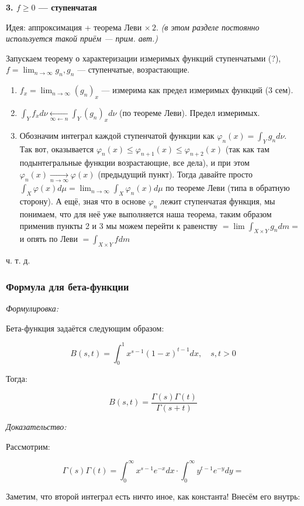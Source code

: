 \documentclass{article}
\def\goesto#1{\underset{#1}{\longrightarrow}}
\def\toinf#1{\goesto{#1 \rightarrow \infty}}
\def\ntoinf{\toinf{n}}
\begin{document}
\textbf{3. $f \ge 0$ --- ступенчатая}

Идея: аппроксимация + теорема Леви $\times \, 2$. \textit{(в этом разделе постоянно используется такой приём --- прим. авт.)}

Запускаем теорему о характеризации измеримых функций ступенчатыми (?), $f = \lim_{n \rightarrow \infty} g_n, g_n$ --- ступенчатые, возрастающие.

\begin{enumerate}
    \item $f_x = \lim_{n \rightarrow \infty} (g_n)_x$ --- измерима как предел измеримых функций (3 сем).
    \item $\int_{Y} f_x d\nu \underset{\infty \leftarrow n}{\longleftarrow} \int_{Y} (g_n)_x d\nu$ (по теореме Леви). Предел измеримых.
    \item Обозначим интеграл каждой ступенчатой функции как $\varphi_n(x) = \int_{Y} g_n d\nu$. Так вот, оказывается $\varphi_n(x) \le \varphi_{n + 1}(x) \le \varphi_{n + 2}(x)$ (так как там подынтегральные функции возрастающие, все дела), и при этом $\varphi_n(x) \ntoinf \varphi(x)$ (предыдущий пункт). Тогда давайте просто $\int_{X} \varphi(x) d\mu = \lim_{n \rightarrow \infty} \int_{X} \varphi_n(x) d\mu$ по теореме Леви (типа в обратную сторону). А ещё, зная что в основе $\varphi_n$ лежит ступенчатая функция, мы понимаем, что для неё уже выполняется наша теорема, таким образом применив пункты 2 и 3 мы можем перейти к равенству $= \lim \int_{X \times Y} g_n dm = $ и опять по Леви $ = \int_{X \times Y} fdm$
\end{enumerate}

ч. т. д. 

\subsubsection{Формула для бета-функции}
\textit{Формулировка:}

Бета-функция задаётся следующим образом: 

\[B(s, t) = \int_{0}^{1}x^{s - 1}(1 - x)^{t - 1}dx, \quad s, t > 0\]

Тогда:

\[B(s, t) = \frac{\Gamma(s)\Gamma(t)}{\Gamma(s + t)}\]

\textit{Доказательство:}

Рассмотрим:

\[\Gamma(s)\Gamma(t) = \int_{0}^{\infty}x^{s - 1}e^{-x}dx \cdot \int_{0}^{\infty} y^{t - 1}e^{-y} dy = \]

Заметим, что второй интеграл есть ничто иное, как константа! Внесём его внутрь:
\end{document}
